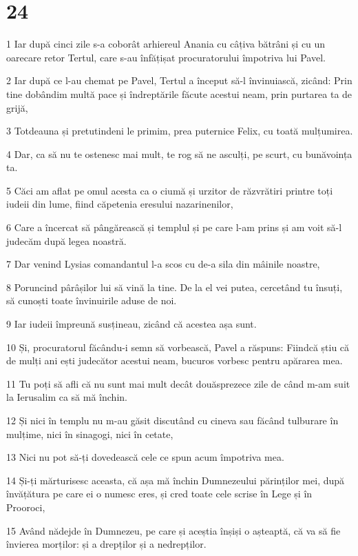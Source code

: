 \chapter{24}

\par 1 Iar după cinci zile s-a coborât arhiereul Anania cu câțiva bătrâni și cu un oarecare retor Tertul, care s-au înfățișat procuratorului împotriva lui Pavel.
\par 2 Iar după ce l-au chemat pe Pavel, Tertul a început să-l învinuiască, zicând: Prin tine dobândim multă pace și îndreptările făcute acestui neam, prin purtarea ta de grijă,
\par 3 Totdeauna și pretutindeni le primim, prea puternice Felix, cu toată mulțumirea.
\par 4 Dar, ca să nu te ostenesc mai mult, te rog să ne asculți, pe scurt, cu bunăvoința ta.
\par 5 Căci am aflat pe omul acesta ca o ciumă și urzitor de răzvrătiri printre toți iudeii din lume, fiind căpetenia eresului nazarinenilor,
\par 6 Care a încercat să pângărească și templul și pe care l-am prins și am voit să-l judecăm după legea noastră.
\par 7 Dar venind Lysias comandantul l-a scos cu de-a sila din mâinile noastre,
\par 8 Poruncind pârâșilor lui să vină la tine. De la el vei putea, cercetând tu însuți, să cunoști toate învinuirile aduse de noi.
\par 9 Iar iudeii împreună susțineau, zicând că acestea așa sunt.
\par 10 Și, procuratorul făcându-i semn să vorbească, Pavel a răspuns: Fiindcă știu că de mulți ani ești judecător acestui neam, bucuros vorbesc pentru apărarea mea.
\par 11 Tu poți să afli că nu sunt mai mult decât douăsprezece zile de când m-am suit la Ierusalim ca să mă închin.
\par 12 Și nici în templu nu m-au găsit discutând cu cineva sau făcând tulburare în mulțime, nici în sinagogi, nici în cetate,
\par 13 Nici nu pot să-ți dovedească cele ce spun acum împotriva mea.
\par 14 Și-ți mărturisesc aceasta, că așa mă închin Dumnezeului părinților mei, după învățătura pe care ei o numesc eres, și cred toate cele scrise în Lege și în Prooroci,
\par 15 Având nădejde în Dumnezeu, pe care și aceștia înșiși o așteaptă, că va să fie învierea morților: și a drepților și a nedrepților.
